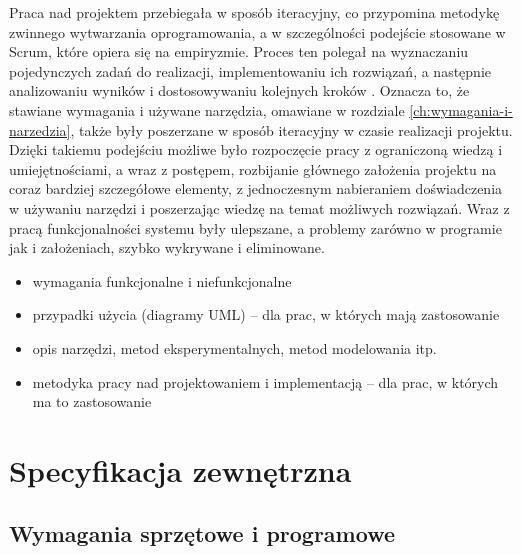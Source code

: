 \documentclass[a4paper,twoside,12pt]{book}
\begin{document}
Praca nad projektem przebiegała w sposób iteracyjny, co przypomina metodykę zwinnego wytwarzania oprogramowania, a w szczególności podejście stosowane w Scrum, które opiera się na empiryzmie. Proces ten polegał na wyznaczaniu pojedynczych zadań do realizacji, implementowaniu ich rozwiązań, a następnie analizowaniu wyników i dostosowywaniu kolejnych kroków \cite{bib:Scrum-guide}. Oznacza to, że stawiane wymagania i używane narzędzia, omawiane w rozdziale \ref{ch:wymagania-i-narzedzia}, także były poszerzane w sposób iteracyjny w czasie realizacji projektu. Dzięki takiemu podejściu możliwe było rozpoczęcie pracy z ograniczoną wiedzą i umiejętnościami, a wraz z postępem, rozbijanie głównego założenia projektu na coraz bardziej szczegółowe elementy, z jednoczesnym nabieraniem doświadczenia w używaniu narzędzi i poszerzając wiedzę na temat możliwych rozwiązań. Wraz z pracą funkcjonalności systemu były ulepszane, a problemy zarówno w programie jak i założeniach, szybko wykrywane i eliminowane.

\begin{itemize}
\item wymagania funkcjonalne i niefunkcjonalne
\item przypadki użycia (diagramy UML) -- dla prac, w których mają zastosowanie
\item opis narzędzi, metod eksperymentalnych, metod modelowania itp.
\item metodyka pracy nad projektowaniem i implementacją -- dla prac, w których ma to zastosowanie
\end{itemize}


%
%
%
\chapter{Specyfikacja zewnętrzna}
\label{ch:Specyfikacja-zewnetrzna}

\section{Wymagania sprzętowe i programowe}

\end{document}
